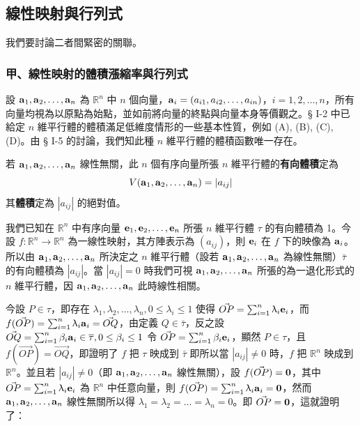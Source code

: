 \subsection{線性映射與行列式}\label{sec:b6-1-7}
\resetsectcounters

我們要討論二者間緊密的關聯。

\subsubsection*{甲、線性映射的體積漲縮率與行列式}\label{subsec:b6-1-7-a}

設 $\boldsymbol{\mathbf{a}}_1, \boldsymbol{\mathbf{a}}_2, \dots, \boldsymbol{\mathbf{a}}_n$ 為 $\mathbb{R}^n$ 中 $n$ 個向量，$\boldsymbol{\mathbf{a}}_i=(a_{i1}, a_{i2}, \dots, a_{in})$，$i=1, 2, \dots, n$，所有向量均視為以原點為始點，並如前將向量的終點與向量本身等價觀之。§ I-2 中已給定 $n$ 維平行體的體積滿足低維度情形的一些基本性質，例如 (A), (B), (C), (D)。由 § I-5 的討論，我們知此種 $n$ 維平行體的體積函數唯一存在。

\begin{definition*}\label{def:b6-1-8}
若 $\boldsymbol{\mathbf{a}}_1, \boldsymbol{\mathbf{a}}_2, \dots, \boldsymbol{\mathbf{a}}_n$ 線性無關，此 $n$ 個有序向量所張 $n$ 維平行體的\textbf{有向體積}定為
\[ V(\boldsymbol{\mathbf{a}}_1, \boldsymbol{\mathbf{a}}_2, \dots, \boldsymbol{\mathbf{a}}_n) = |a_{ij}| \]
其\textbf{體積}定為 $|a_{ij}|$ 的絕對值。
\end{definition*}

我們已知在 $\mathbb{R}^n$ 中有序向量 $\boldsymbol{\mathbf{e}}_1, \boldsymbol{\mathbf{e}}_2, \dots, \boldsymbol{\mathbf{e}}_n$ 所張 $n$ 維平行體 $\tau$ 的有向體積為 1。今設 $f: \mathbb{R}^n \longrightarrow \mathbb{R}^n$ 為一線性映射，其方陣表示為 $(a_{ij})$，則 $\boldsymbol{\mathbf{e}}_i$ 在 $f$ 下的映像為 $\boldsymbol{\mathbf{a}}_i$。所以由 $\boldsymbol{\mathbf{a}}_1, \boldsymbol{\mathbf{a}}_2, \dots, \boldsymbol{\mathbf{a}}_n$ 所決定之 $n$ 維平行體（設若 $\boldsymbol{\mathbf{a}}_1, \boldsymbol{\mathbf{a}}_2, \dots, \boldsymbol{\mathbf{a}}_n$ 為線性無關）$\bar{\tau}$ 的有向體積為 $|a_{ij}|$。當 $|a_{ij}| = 0$ 時我們可視 $\boldsymbol{\mathbf{a}}_1, \boldsymbol{\mathbf{a}}_2, \dots, \boldsymbol{\mathbf{a}}_n$ 所張的為一退化形式的 $n$ 維平行體，因 $\boldsymbol{\mathbf{a}}_1, \boldsymbol{\mathbf{a}}_2, \dots, \boldsymbol{\mathbf{a}}_n$ 此時線性相關。

今設 $P \in \tau$，即存在 $\lambda_1, \lambda_2, \dots, \lambda_n, 0 \le \lambda_i \le 1$ 使得 $\vec{OP} = \sum_{i=1}^n \uplambda_i \boldsymbol{\mathbf{e}}_i$，而 $f(\vec{OP}) = \sum_{i=1}^n \uplambda_i \boldsymbol{\mathbf{a}}_i = \vec{OQ}$，由定義 $Q \in \bar{\tau}$，反之設 $\vec{OQ} = \sum_{i=1}^n \beta_i \boldsymbol{\mathbf{a}}_i \in \overline{\tau}, 0 \le \beta_i \le 1$ 令 $\vec{OP} = \sum_{i=1}^n \beta_i \boldsymbol{\mathbf{e}}_i$，顯然 $P \in \tau$，且 $f(\vec{OP}) = \vec{OQ}$，即證明了 $f$ 把 $\tau$ 映成到 $\bar{\tau}$ 即所以當 $|a_{ij}| \ne 0$ 時，$f$ 把 $\mathbb{R}^n$ 映成到 $\mathbb{R}^n$。並且若 $|a_{ij}| \ne 0$（即 $\boldsymbol{\mathbf{a}}_1, \boldsymbol{\mathbf{a}}_2, \dots, \boldsymbol{\mathbf{a}}_n$ 線性無關），設 $f(\vec{OP}) = \boldsymbol{\mathbf{0}}$，其中 $\vec{OP} = \sum_{i=1}^n \uplambda_i \boldsymbol{\mathbf{e}}_i$ 為 $\mathbb{R}^n$ 中任意向量，則 $f(\vec{OP}) = \sum_{i=1}^n \uplambda_i \boldsymbol{\mathbf{a}}_i = \boldsymbol{\mathbf{0}}$，然而 $\boldsymbol{\mathbf{a}}_1, \boldsymbol{\mathbf{a}}_2, \dots, \boldsymbol{\mathbf{a}}_n$ 線性無關所以得 $\lambda_1 = \lambda_2 = \dots = \lambda_n = 0$。即 $\vec{OP} = \boldsymbol{\mathbf{0}}$，這就證明了：

